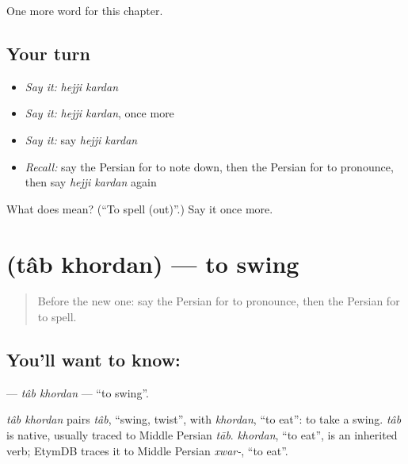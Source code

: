 \begin{grammarlens}[title={What you've built}]
One more word for this chapter.
\end{grammarlens}

\subsection*{Your turn}
\begin{itemize}
\raggedright
  \item \emph{Say it:} \emph{hejji kardan}
  \item \emph{Say it:} \emph{hejji kardan}, once more
  \item \emph{Say it:} say \emph{hejji kardan}
  \item \emph{Recall:} say the Persian for to note down, then the Persian for to pronounce, then say \emph{hejji kardan} again
\end{itemize}

\begin{tcolorbox}[breakable,colback=teal!4,colframe=teal!35!black,title={Before you move on}]
What does   mean? (\textquotedblleft{}To spell (out)\textquotedblright{}.) Say it once more.
\end{tcolorbox}
\section[\texorpdfstring{\fa{تاب} \fa{خوردن} (tâb khordan)}{تاب خوردن (tâb khordan)}]{  (tâb khordan) — to swing}

\label{lesson:FA-C188-tab-khordan}



\begin{quote}
Before the new one: say the Persian for to pronounce, then the Persian for to spell.
\end{quote}

\subsection*{You'll want to know:  }
\textbf{ } — \emph{tâb khordan} — \textquotedblleft{}to swing\textquotedblright{}.

\begin{cousinweb}
\emph{tâb khordan} pairs \emph{tâb}, \textquotedblleft{}swing, twist\textquotedblright{}, with \emph{khordan}, \textquotedblleft{}to eat\textquotedblright{}: to take a swing. \emph{tâb} is native, usually traced to Middle Persian \emph{tāb}. \emph{khordan}, \textquotedblleft{}to eat\textquotedblright{}, is an inherited verb; EtymDB traces it to Middle Persian \emph{xwar-}, \textquotedblleft{}to eat\textquotedblright{}.
\end{cousinweb}

